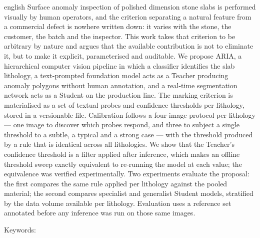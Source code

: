 \begin{resumo}[Abstract]
  \vspace{-15pt}

  \begin{otherlanguage*}{english}
  Surface anomaly inspection of polished dimension stone slabs is performed visually by human operators, and the criterion separating a natural feature from a commercial defect is nowhere written down: it varies with the stone, the customer, the batch and the inspector. This work takes that criterion to be arbitrary by nature and argues that the available contribution is not to eliminate it, but to make it explicit, parameterised and auditable. We propose ARIA, a hierarchical computer vision pipeline in which a classifier identifies the slab lithology, a text-prompted foundation model acts as a Teacher producing anomaly polygons without human annotation, and a real-time segmentation network acts as a Student on the production line. The marking criterion is materialised as a set of textual probes and confidence thresholds per lithology, stored in a versionable file. Calibration follows a four-image protocol per lithology --- one image to discover which probes respond, and three to subject a single threshold to a subtle, a typical and a strong case --- with the threshold produced by a rule that is identical across all lithologies. We show that the Teacher's confidence threshold is a filter applied after inference, which makes an offline threshold sweep exactly equivalent to re-running the model at each value; the equivalence was verified experimentally. Two experiments evaluate the proposal: the first compares the same rule applied per lithology against the pooled material; the second compares specialist and generalist Student models, stratified by the data volume available per lithology. Evaluation uses a reference set annotated before any inference was run on those same images.

  Keywords: \inlinekeywords
\end{otherlanguage*}
\end{resumo}
